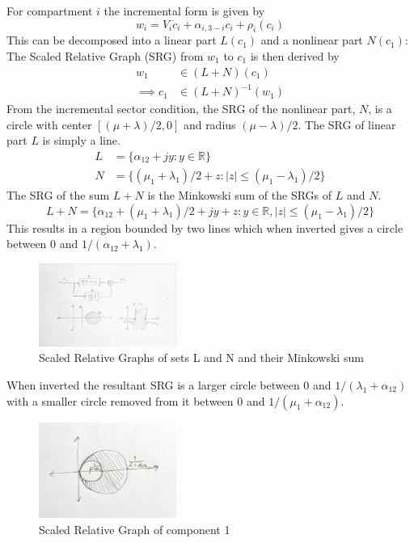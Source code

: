 \documentclass{article}
\begin{document}
For compartment $i$ the incremental form is given by
\begin{equation}
    w_i = V_i \dot{c}_i + \alpha_{i,3-i} c_i + \rho_i(c_i)
\end{equation}
This can be decomposed into a linear part $L(c_1)$ and a nonlinear part $N(c_1)$:
The Scaled Relative Graph (SRG) from $w_1$ to $c_1$ is then derived by
\begin{align}
    w_1 &\in (L + N)(c_1) \\
    \implies c_1 &\in (L + N)^{-1}(w_1) 
\end{align}
From the incremental sector condition, the SRG of the nonlinear part, $N$, is a circle with center $[(\mu+\lambda)/2, 0]$ and radius $(\mu-\lambda)/2$.
The SRG of linear part $L$ is simply a line.
\begin{align}
    L &= \{ \alpha_{12} + j y : y \in \mathbb{R} \} \\
    N &= \{ (\mu_1 + \lambda_1)/2 + z : |z| \leq (\mu_1 - \lambda_1)/2 \}
\end{align}
The SRG of the sum $L + N$ is the Minkowski sum of the SRGs of $L$ and $N$.
\begin{equation}
    L + N = \{ \alpha_{12} + (\mu_1 + \lambda_1)/2 + jy + z : y \in \mathbb{R}, |z| \leq (\mu_1 - \lambda_1)/2 \}
\end{equation}
This results in a region bounded by two lines which when inverted gives a circle between 0 and $1/(\alpha_{12} + \lambda_1)$.

\begin{figure}[H]
    \centering
    \includegraphics[width=0.4\textwidth]{figures/componentSRGs.jpg}
    \caption{Scaled Relative Graphs of sets L and N and their Minkowski sum}
\end{figure}
When inverted the resultant SRG is a larger circle between 0 and $1/(\lambda_1 + \alpha_{12})$ with a smaller circle removed from it between 0 and $1/(\mu_1 + \alpha_{12})$.
\begin{figure}[H]
    \centering
    \includegraphics[width=0.4\textwidth]{figures/compartmentSRG.jpg}
    \caption{Scaled Relative Graph of component 1}
\end{figure}
\end{document}
